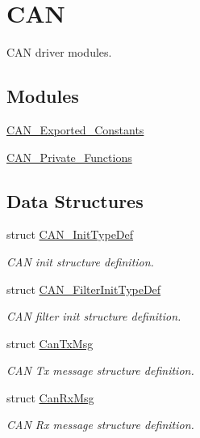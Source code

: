 \hypertarget{group___c_a_n}{\section{C\-A\-N}
\label{group___c_a_n}
}


C\-A\-N driver modules.  


\subsection*{Modules}
\begin{DoxyCompactItemize}
\item 
\hyperlink{group___c_a_n___exported___constants}{C\-A\-N\-\_\-\-Exported\-\_\-\-Constants}
\item 
\hyperlink{group___c_a_n___private___functions}{C\-A\-N\-\_\-\-Private\-\_\-\-Functions}
\end{DoxyCompactItemize}
\subsection*{Data Structures}
\begin{DoxyCompactItemize}
\item 
struct \hyperlink{struct_c_a_n___init_type_def}{C\-A\-N\-\_\-\-Init\-Type\-Def}
\begin{DoxyCompactList}\small\item\em C\-A\-N init structure definition. \end{DoxyCompactList}\item 
struct \hyperlink{struct_c_a_n___filter_init_type_def}{C\-A\-N\-\_\-\-Filter\-Init\-Type\-Def}
\begin{DoxyCompactList}\small\item\em C\-A\-N filter init structure definition. \end{DoxyCompactList}\item 
struct \hyperlink{struct_can_tx_msg}{Can\-Tx\-Msg}
\begin{DoxyCompactList}\small\item\em C\-A\-N Tx message structure definition. \end{DoxyCompactList}\item 
struct \hyperlink{struct_can_rx_msg}{Can\-Rx\-Msg}
\begin{DoxyCompactList}\small\item\em C\-A\-N Rx message structure definition. \end{DoxyCompactList}\end{DoxyCompactItemize}

